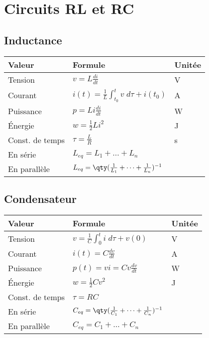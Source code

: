 \section{Circuits RL et RC}
\subsection{Inductance}
\centering
\begin{tabular}{lll}
Valeur & Formule & Unitée \\\hline
Tension      & \(v=L\frac{di}{dt} \) & V \\[5pt]
Courant      & \(i(t)=\frac{1}{L}\int_{t_0}^{t} v \;d \tau + i(t_0) \) & A \\[5pt]
Puissance    & \(p=Li\frac{di}{dt} \) & W \\[5pt]
Énergie      & \(w=\frac{1}{2}Li^2\) & J \\[5pt]\hline\rule{0pt}{15pt}
Const. de temps & \(\tau = \frac{L}{R} \)& s\\[5pt]\hline\rule{0pt}{15pt}
En série     & \(L_{eq} = L_1 + \dots + L_n\) &   \\
En parallèle & \(L_{eq} = \qty(\frac{1}{L_1} + \dots + \frac{1}{L_n})^{-1} \) & 
\end{tabular}%

\subsection{Condensateur}
\centering
\begin{tabular}{lll}
Valeur & Formule & Unitée \\\hline\rule{0pt}{15pt}
Tension      & \(v=\frac{1}{C}\int_{0}^{t} i \;d \tau + v(0)  \) & V \\[10pt]
Courant      & \(i(t)=C\frac{dv}{dt}\) & A \\[5pt]
Puissance    & \(p(t)=vi=Cv\frac{dv}{dt} \) & W \\[5pt]
Énergie      & \(w=\frac{1}{2}Cv^2\) & J \\[5pt]\hline\rule{0pt}{10pt}
Const. de temps & \(\tau = RC\) & \\\hline\rule{0pt}{5pt}
En série     & \(C_{eq} = \qty(\frac{1}{C_1} + \dots + \frac{1}{C_n})^{-1} \) &   \\[10pt]
En parallèle & \(C_{eq} = C_1 + \dots + C_n\) &  
\end{tabular}%


